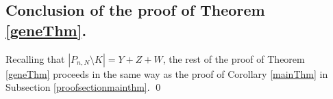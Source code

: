 


\subsection*{Conclusion of the proof of Theorem \ref{geneThm}.}

Recalling that $|P_{n,N} \setminus K| = Y + Z+W$,  the rest of the proof of Theorem \ref{geneThm} proceeds in the same way as the proof of Corollary \ref{mainThm} in Subsection \ref{proofsectionmainthm}. \qed




